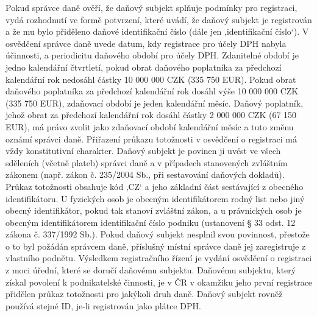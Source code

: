 \documentclass[10pt]{article}
\begin{document}
Pokud správce daně ověří, že daňový subjekt splňuje podmínky pro registraci, vydá rozhodnutí ve formě potvrzení, které uvádí, že daňový subjekt je registrován a že mu bylo přiděleno daňové identifikační číslo (dále jen ‚identifikační číslo‘).
V osvědčení správce daně uvede datum, kdy registrace pro účely DPH nabyla účinnosti, a periodicitu daňového období pro účely DPH.
Zdanitelné období je jedno kalendářní čtvrtletí, pokud obrat daňového poplatníka za předchozí kalendářní rok nedosáhl částky 10 000 000 CZK (335 750 EUR).
Pokud obrat daňového poplatníka za předchozí kalendářní rok dosáhl výše 10 000 000 CZK (335 750 EUR), zdaňovací období je jeden kalendářní měsíc.
Daňový poplatník, jehož obrat za předchozí kalendářní rok dosáhl částky 2 000 000 CZK (67 150 EUR), má právo zvolit jako zdaňovací období kalendářní měsíc a tuto změnu oznámí správci daně.
Přiřazení průkazu totožnosti v osvědčení o registraci má vždy konstitutivní charakter.
Daňový subjekt je povinen ji uvést ve všech sděleních (včetně plateb) správci daně a v případech stanovených zvláštním zákonem (např. zákon č. 235/2004 Sb., při sestavování daňových dokladů).
Průkaz totožnosti obsahuje kód ‚CZ‘ a jeho základní část sestávající z obecného identifikátoru.
U fyzických osob je obecným identifikátorem rodný list nebo jiný obecný identifikátor, pokud tak stanoví zvláštní zákon, a u právnických osob je obecným identifikátorem identifikační číslo podniku (ustanovení § 33 odst. 12 zákona č. 337/1992 Sb.).
Pokud daňový subjekt nesplnil svou povinnost, přestože o to byl požádán správcem daně, příslušný místní správce daně jej zaregistruje z vlastního podnětu.
Výsledkem registračního řízení je vydání osvědčení o registraci z moci úřední, které se doručí daňovému subjektu.
Daňovému subjektu, který získal povolení k podnikatelské činnosti, je v ČR v okamžiku jeho první registrace přidělen průkaz totožnosti pro jakýkoli druh daně.
Daňový subjekt rovněž používá stejné ID, je-li registrován jako plátce DPH.
\end{document}
